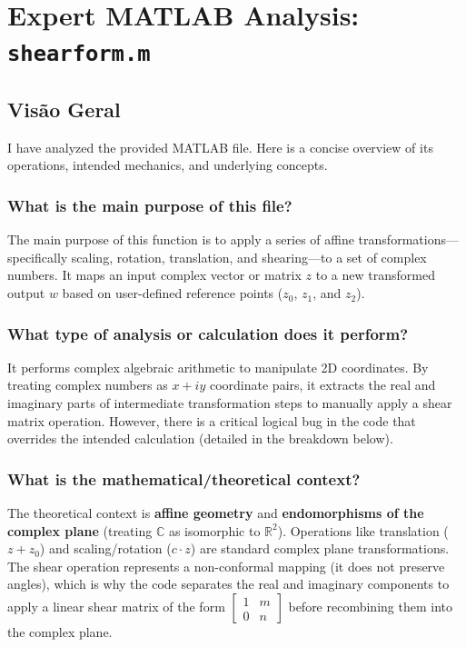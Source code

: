 
\chapter{Expert MATLAB Analysis: \texttt{shearform.m}}
\section*{Visão Geral}

I have analyzed the provided MATLAB file. Here is a concise overview of its operations, intended mechanics, and underlying concepts.

\subsection*{What is the main purpose of this file?}
The main purpose of this function is to apply a series of affine transformations—specifically scaling, rotation, translation, and shearing—to a set of complex numbers. It maps an input complex vector or matrix $z$ to a new transformed output $w$ based on user-defined reference points ($z_0$, $z_1$, and $z_2$). 

\subsection*{What type of analysis or calculation does it perform?}
It performs complex algebraic arithmetic to manipulate 2D coordinates. By treating complex numbers as $x + iy$ coordinate pairs, it extracts the real and imaginary parts of intermediate transformation steps to manually apply a shear matrix operation. However, there is a critical logical bug in the code that overrides the intended calculation (detailed in the breakdown below).

\subsection*{What is the mathematical/theoretical context?}
The theoretical context is \textbf{affine geometry} and \textbf{endomorphisms of the complex plane} (treating $\mathbb{C}$ as isomorphic to $\mathbb{R}^2$). Operations like translation ($z + z_0$) and scaling/rotation ($c \cdot z$) are standard complex plane transformations. The shear operation represents a non-conformal mapping (it does not preserve angles), which is why the code separates the real and imaginary components to apply a linear shear matrix of the form $\begin{bmatrix} 1 & m \\ 0 & n \end{bmatrix}$ before recombining them into the complex plane.


